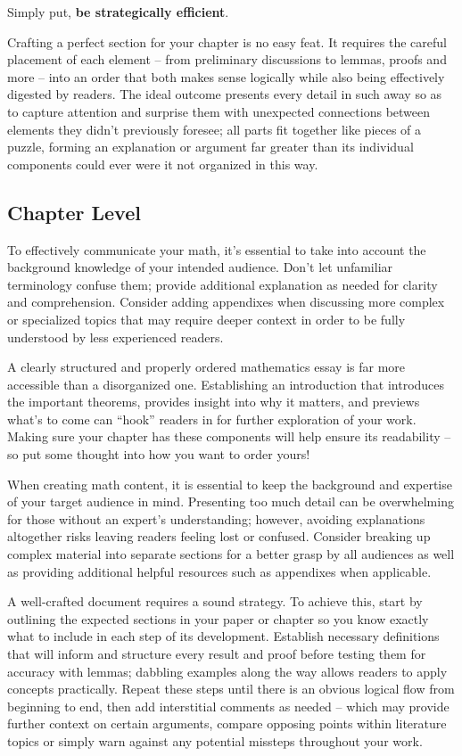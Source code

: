\documentclass[
  twoside,
  12pt,
  letterpaper,
  fleqn]{article}
\begin{document}
Simply put, \textbf{be strategically efficient}.

Crafting a perfect section for your chapter is no easy feat. It requires
the careful placement of each element -- from preliminary discussions to
lemmas, proofs and more -- into an order that both makes sense logically
while also being effectively digested by readers. The ideal outcome
presents every detail in such away so as to capture attention and
surprise them with unexpected connections between elements they didn't
previously foresee; all parts fit together like pieces of a puzzle,
forming an explanation or argument far greater than its individual
components could ever were it not organized in this way.

\hypertarget{chapter-level}{%
\subsection{Chapter Level}\label{chapter-level}}

To effectively communicate your math, it's essential to take into
account the background knowledge of your intended audience. Don't let
unfamiliar terminology confuse them; provide additional explanation as
needed for clarity and comprehension. Consider adding appendixes when
discussing more complex or specialized topics that may require deeper
context in order to be fully understood by less experienced readers.

A clearly structured and properly ordered mathematics essay is far more
accessible than a disorganized one. Establishing an introduction that
introduces the important theorems, provides insight into why it matters,
and previews what's to come can ``hook'' readers in for further
exploration of your work. Making sure your chapter has these components
will help ensure its readability -- so put some thought into how you
want to order yours!

When creating math content, it is essential to keep the background and
expertise of your target audience in mind. Presenting too much detail
can be overwhelming for those without an expert's understanding;
however, avoiding explanations altogether risks leaving readers feeling
lost or confused. Consider breaking up complex material into separate
sections for a better grasp by all audiences as well as providing
additional helpful resources such as appendixes when applicable.

A well-crafted document requires a sound strategy. To achieve this,
start by outlining the expected sections in your paper or chapter so you
know exactly what to include in each step of its development. Establish
necessary definitions that will inform and structure every result and
proof before testing them for accuracy with lemmas; dabbling examples
along the way allows readers to apply concepts practically. Repeat these
steps until there is an obvious logical flow from beginning to end, then
add interstitial comments as needed -- which may provide further context
on certain arguments, compare opposing points within literature topics
or simply warn against any potential missteps throughout your work.
\end{document}
